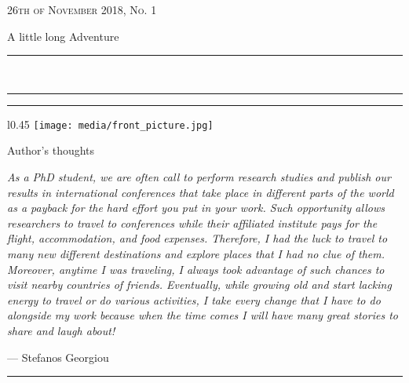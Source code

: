 \documentclass[10pt,a4paper]{article} %
\newcommand{\HorRule}[1]{\noindent\rule{\linewidth}{#1}} %
\newcommand{\SepRule}{\noindent	%
\begin{center}
\rule{250pt}{1pt} %
\end{center}
}
\newcommand{\NewsletterName}[1]{ %
\begin{center}
\Huge \usefont{T1}{fvs}{b}{n} %
#1
\end{center}	
\par \normalsize \normalfont}
\newcommand{\JournalIssue}[1]{ %
\hfill \textsc{26th of November 2018, No. #1} %
\par \normalsize \normalfont}
\newcommand{\NewsItem}[1]{ %
\usefont{T1}{fvs}{n}{n} %
\vspace{24pt}\large #1\vspace{3pt} %
\par \normalsize \normalfont}
\begin{document}
\JournalIssue{1} %

\NewsletterName{A little long Adventure} %

\noindent\HorRule{3pt} \\[-0.75\baselineskip] %
\HorRule{1pt} %


\vspace{0.5cm}
\SepRule
\vspace{-0.5cm}

\begin{center}
\begin{minipage}[h]{0.75 \linewidth}
\begin{wrapfigure}{l}{0.45 \textwidth}
	\texttt{[image: media/front\_picture.jpg]} \\
\end{wrapfigure}
	
\NewsItem{Author's thoughts} %
\vspace{3pt} %
\textit{
As a PhD student, we are often call to perform research studies and publish our
results in international conferences that take place in different parts of the world
as a payback for the hard effort you put in your work.
Such opportunity allows researchers to travel to conferences while their
affiliated institute pays for the flight, accommodation, and food expenses. 
Therefore, I had the luck to travel to many new different destinations
and explore places that I had no clue of them.
Moreover, anytime I was traveling, I always took advantage of such chances
to visit nearby countries of friends.
Eventually, while growing old and start lacking energy to travel or do various activities,
I take every change that I have to do alongside my work because when the time comes
I will have many great stories to share and laugh about!
}
\par\hfill --- Stefanos Georgiou
\end{minipage}
\end{center}

\vspace{0.5cm}
\SepRule %
\vspace{0.5cm}
\end{document}
